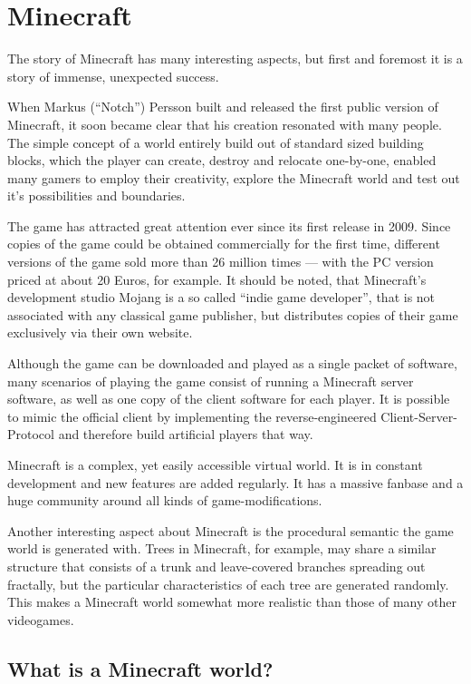 \chapter{Minecraft}
The story of Minecraft has many interesting aspects, but first and foremost it is a story of immense, unexpected success.

When Markus (``Notch'') Persson built and released the first public version of Minecraft, it soon became clear that his creation resonated with many people. The simple concept of a world entirely build out of standard sized building blocks, which the player can create, destroy and relocate one-by-one, enabled many gamers to employ their creativity, explore the Minecraft world and test out it's possibilities and boundaries.

The game has attracted great attention ever since its first release in 2009. Since copies of the game could be obtained commercially for the first time, different versions of the game sold more than 26 million times --- with the PC version priced at about 20 Euros, for example. It should be noted, that Minecraft's development studio Mojang is a so called ``indie game developer'', that is not associated with any classical game publisher, but distributes copies of their game exclusively via their own website.

Although the game can be downloaded and played as a single packet of software, many scenarios of playing the game consist of running a Minecraft server software, as well as one copy of the client software for each player. It is possible to mimic the official client by implementing the reverse-engineered Client-Server-Protocol and therefore build artificial players that way.

Minecraft is a complex, yet easily accessible virtual world. It is in constant development and new features are added regularly. It has a massive fanbase and a huge community around all kinds of game-modifications.

Another interesting aspect about Minecraft is the procedural semantic the game world is generated with. Trees in Minecraft, for example, may share a similar structure that consists of a trunk and leave-covered branches spreading out fractally, but the particular characteristics of each tree are generated randomly. This makes a Minecraft world somewhat more realistic than those of many other videogames.

        \section{What is a Minecraft world?}

